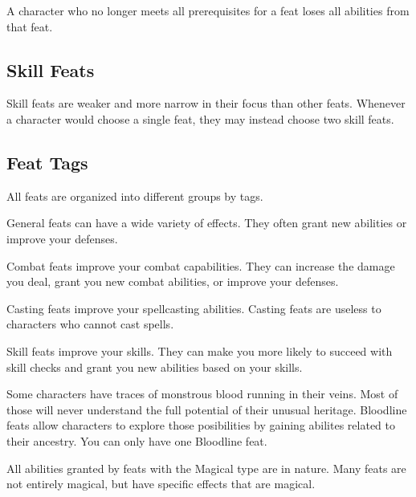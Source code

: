         A character who no longer meets all prerequisites for a feat loses all abilities from that feat.

    \subsection{Skill Feats}
        Skill feats are weaker and more narrow in their focus than other feats.
        Whenever a character would choose a single feat, they may instead choose two skill feats.

    \subsection{Feat Tags}
        All feats are organized into different groups by tags.

         General feats can have a wide variety of effects.
        They often grant new abilities or improve your defenses.

         Combat feats improve your combat capabilities.
        They can increase the damage you deal, grant you new combat abilities, or improve your defenses.

         Casting feats improve your spellcasting abilities.
        Casting feats are useless to characters who cannot cast spells.

         Skill feats improve your skills.
        They can make you more likely to succeed with skill checks and grant you new abilities based on your skills.

         Some characters have traces of monstrous blood running in their veins.
        Most of those will never understand the full potential of their unusual heritage.
        Bloodline feats allow characters to explore those posibilities by gaining abilites related to their ancestry.
        You can only have one Bloodline feat.

        All abilities granted by feats with the Magical type are \magical in nature.
        Many feats are not entirely magical, but have specific effects that are magical.


